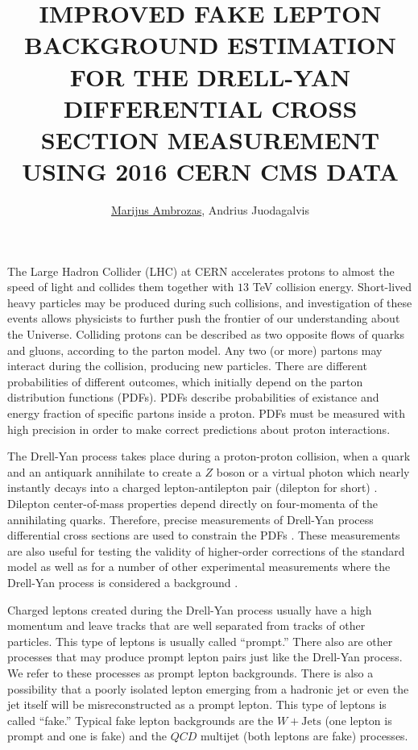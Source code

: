 \documentclass[a4paper,10pt,english]{article}
\begin{document}
\renewcommand{\figurename}{Fig.} 


\title{IMPROVED FAKE LEPTON BACKGROUND ESTIMATION FOR THE DRELL-YAN DIFFERENTIAL CROSS SECTION MEASUREMENT USING 2016 CERN CMS DATA}


\author{\uline{Marijus Ambrozas}, Andrius Juodagalvis}

\maketitle

\address{Institute of Theoretical Physics and Astronomy, Faculty of Physics, Vilnius University, Lithuania}


The Large Hadron Collider (LHC) at CERN accelerates protons to almost the speed of light and collides them together
with $13$ TeV collision energy.
Short-lived heavy particles may be produced during such collisions, and investigation of these events allows physicists
to further push the frontier of our understanding about the Universe.
Colliding protons can be described as two opposite flows of quarks and gluons, according to the parton model.
Any two (or more) partons may interact during the collision, producing new particles.
There are different probabilities of different outcomes, which initially depend on the parton distribution functions (PDFs).
PDFs describe probabilities of existance and energy fraction of specific partons inside a proton.
PDFs must be measured with high precision in order to make correct predictions about proton interactions.

The Drell-Yan process takes place during a proton-proton collision, when a quark and an antiquark annihilate to create
a $Z$ boson or a virtual photon which nearly instantly decays into a charged lepton-antilepton pair (dilepton for short) \cite{DY}.
Dilepton center-of-mass properties depend directly on four-momenta of the annihilating quarks.
Therefore, precise measurements of Drell-Yan process differential cross sections are used to constrain the PDFs \cite{DY13}.
These measurements are also useful for testing the validity of higher-order corrections of the standard model as
well as for a number of other experimental measurements where the Drell-Yan process is considered a background \cite{Higgs, Zprime, SUSY}.

Charged leptons created during the Drell-Yan process usually have a high momentum and leave tracks that are well separated
from tracks of other particles.
This type of leptons is usually called ``prompt.''
There also are other processes that may produce prompt lepton pairs just like the Drell-Yan process.
We refer to these processes as prompt lepton backgrounds.
There is also a possibility that a poorly isolated lepton emerging from a hadronic jet or even the jet itself
will be misreconstructed as a prompt lepton.
This type of leptons is called ``fake.''
Typical fake lepton backgrounds are the $W\!+\!\mathrm{Jets}$ (one lepton is prompt and one is fake) and the $QC\!D$ multijet
(both leptons are fake) processes.
\end{document}
